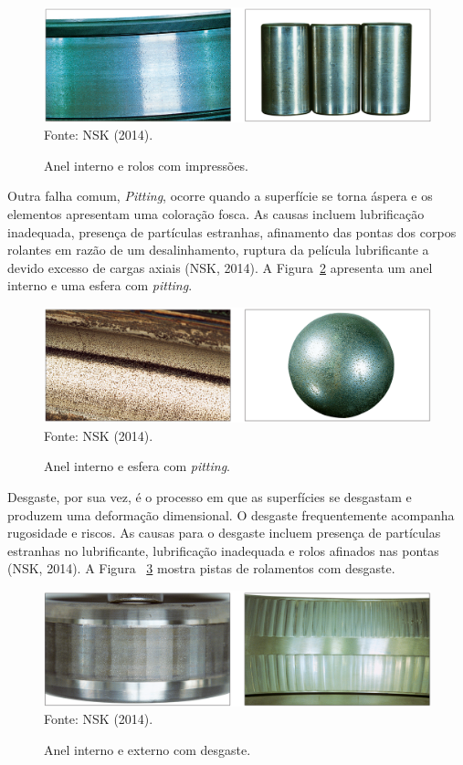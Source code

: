 \documentclass[
	12pt,				
	oneside,			
	a4paper,			
	english,			
	brazil,	
	sumario=abnt-6027-2012		
	]{abntex2ppgsi}
\begin{document}
\begin{figure}[H]
\centering
\caption {Anel interno e rolos com impressões.}
\includegraphics[width=\textwidth,height=\textheight,keepaspectratio]{impressoes_nsk} \\
Fonte: NSK (2014).
\label{impressoes_nsk}
\end{figure}

Outra falha comum, \textit{Pitting}, ocorre quando a superfície se torna áspera e os elementos apresentam uma coloração fosca. As causas incluem lubrificação inadequada, presença de partículas estranhas, afinamento das pontas dos corpos rolantes em razão de um desalinhamento, ruptura da película lubrificante a devido excesso de cargas axiais (NSK, 2014). A Figura~\ref{pitting_nsk} apresenta um anel interno e uma esfera com \textit{pitting}.

\begin{figure}[H]
\centering
\caption {Anel interno e esfera com \textit{pitting}.}
\includegraphics[width=\textwidth,height=\textheight,keepaspectratio]{pitting_nsk} \\
Fonte: NSK (2014).
\label{pitting_nsk}
\end{figure}

Desgaste, por sua vez, é o processo em que as superfícies se desgastam e produzem uma deformação dimensional. O desgaste frequentemente acompanha rugosidade e riscos. As causas para o desgaste incluem presença de partículas estranhas no lubrificante, lubrificação inadequada e rolos afinados nas pontas (NSK, 2014). A Figura ~\ref{desgaste_nsk} mostra pistas de rolamentos com desgaste.

\begin{figure}[H]
\centering
\caption {Anel interno e externo com desgaste.}
\includegraphics[width=\textwidth,height=\textheight,keepaspectratio]{desgaste_nsk} \\
Fonte: NSK (2014).
\label{desgaste_nsk}
\end{figure}
\end{document}
